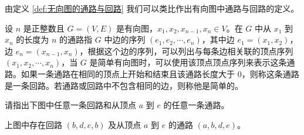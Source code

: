 由定义 \ref{def:无向图的通路与回路} 我们可以类比作出有向图中通路与回路的定义。

\begin{definition}[有向图的通路与回路]\label{def:有向图的通路与回路}
    设 $n$ 是正整数且 $G=(V,E)$ 是有向图，$x_1,x_2,x_{n-1},x_n \in V$。在 $G$ 中从 $x_1$ 到 $x_n$ 的长度为 $n$ 的通路指 $G$ 中边的序列 $(e_1,e_2,\cdots,e_n)$，其中边 $e_1 = (x_1,x_2)$，边 $e_n = (x_{n-1},x_n)$，根据这个边的序列，可以列出与每条边相关联的顶点序列 $(x_1,x_2,\cdots,x_n)$，当 $G$ 是简单有向图时，可以使用该顶点顶点序列来表示这条通路。如果一条通路在相同的顶点上开始和结束且该通路长度大于 $0$，则称这条通路是一条回路。若通路或回路中不包含相同的边，则称他是简单的。
\end{definition}

\begin{collections}
    \begin{example}
        请指出下图中任意一条回路和从顶点 $a$ 到 $e$ 的任意一条通路。
        \begin{center}
        \end{center}
    \end{example}
    \begin{solution}
        上图中存在回路 $(b, d, e, b)$ 及从顶点 $a$ 到 $e$ 的通路 $(a, b, d, e)$。
        \begin{center}

\end{center}
\end{solution}
\end{collections}
